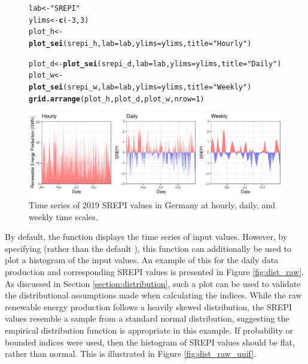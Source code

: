 \documentclass[article,shortnames,nojss]{jss}\usepackage[]{graphicx}\usepackage[]{xcolor}
\makeatletter
\newcommand{\hlnum}[1]{\textcolor[rgb]{0.686,0.059,0.569}{#1}}%
\newcommand{\hlstr}[1]{\textcolor[rgb]{0.192,0.494,0.8}{#1}}%
\newcommand{\hlopt}[1]{\textcolor[rgb]{0,0,0}{#1}}%
\newcommand{\hlstd}[1]{\textcolor[rgb]{0.345,0.345,0.345}{#1}}%
\newcommand{\hlkwb}[1]{\textcolor[rgb]{0.69,0.353,0.396}{#1}}%
\newcommand{\hlkwc}[1]{\textcolor[rgb]{0.333,0.667,0.333}{#1}}%
\newcommand{\hlkwd}[1]{\textcolor[rgb]{0.737,0.353,0.396}{\textbf{#1}}}%
\newenvironment{kframe}{%
 \def\at@end@of@kframe{}%
 \ifinner\ifhmode%
  \def\at@end@of@kframe{\end{minipage}}%
  \begin{minipage}{\columnwidth}%
 \fi\fi%
 \def\FrameCommand##1{\hskip\@totalleftmargin \hskip-\fboxsep
 \colorbox{shadecolor}{##1}\hskip-\fboxsep
     \hskip-\linewidth \hskip-\@totalleftmargin \hskip\columnwidth}%
 \MakeFramed {\advance\hsize-\width
   \@totalleftmargin\z@ \linewidth\hsize
   \@setminipage}}%
 {\par\unskip\endMakeFramed%
 \at@end@of@kframe}
\newenvironment{knitrout}{}{} %
\makeatother
\begin{document}
\begin{figure}
\begin{knitrout}
\color{fgcolor}\begin{kframe}
\begin{alltt}
\hlstd{lab} \hlkwb{<-} \hlstr{"SREPI"}
\hlstd{ylims} \hlkwb{<-} \hlkwd{c}\hlstd{(}\hlopt{-}\hlnum{3}\hlstd{,} \hlnum{3}\hlstd{)}
\hlstd{plot_h} \hlkwb{<-} \hlkwd{plot_sei}\hlstd{(srepi_h,} \hlkwc{lab} \hlstd{= lab,} \hlkwc{ylims} \hlstd{= ylims,} \hlkwc{title} \hlstd{=} \hlstr{"Hourly"}\hlstd{)}
\end{alltt}


{\ttfamily\noindent\bfseries\color{errorcolor}{\#\# Error in eval(expr, envir, enclos): object 'srepi\_h' not found}}\begin{alltt}
\hlstd{plot_d} \hlkwb{<-} \hlkwd{plot_sei}\hlstd{(srepi_d,} \hlkwc{lab} \hlstd{= lab,} \hlkwc{ylims} \hlstd{= ylims,} \hlkwc{title} \hlstd{=} \hlstr{"Daily"}\hlstd{)}
\hlstd{plot_w} \hlkwb{<-} \hlkwd{plot_sei}\hlstd{(srepi_w,} \hlkwc{lab} \hlstd{= lab,} \hlkwc{ylims} \hlstd{= ylims,} \hlkwc{title} \hlstd{=} \hlstr{"Weekly"}\hlstd{)}
\hlkwd{grid.arrange}\hlstd{(plot_h, plot_d, plot_w,} \hlkwc{nrow} \hlstd{=} \hlnum{1}\hlstd{)}
\end{alltt}
\end{kframe}

{\centering \includegraphics[width=\linewidth]{figure/plot_sei_ts-1} 

}


\end{knitrout}
\caption{Time series of 2019 SREPI values in Germany at hourly, daily, and weekly time scales.}
\label{fig:ts_si}
\end{figure}

By default, the  function displays the time series of input values. However, by specifying  (rather than the default ), this function can additionally be used to plot a histogram of the input values. An example of this for the daily data production and corresponding SREPI values is presented in Figure \ref{fig:dist_raw}. As discussed in Section \ref{section:distribution}, such a plot can be used to validate the distributional assumptions made when calculating the indices. While the raw renewable energy production follows a heavily skewed distribution, the SREPI values resemble a sample from a standard normal distribution, suggesting the empirical distribution function is appropriate in this example. If probability or bounded indices were used, then the histogram of SREPI values should be flat, rather than normal. This is illustrated in Figure \ref{fig:dist_raw_unif}.
\end{document}
